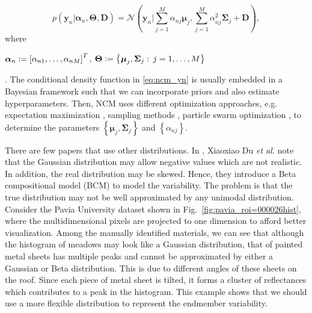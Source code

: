 \documentclass[twocolumn,english]{IEEEtran}
\theoremstyle{plain}
\begin{document}
\begin{equation}
p\left(\mathbf{y}_{n}\vert\boldsymbol{\alpha}_{n},\boldsymbol{\Theta},\mathbf{D}\right)=\mathcal{N}\left(\mathbf{y}_{n}\vert\sum_{j=1}^{M}\alpha_{nj}\boldsymbol{\mu}_{j},\sum_{j=1}^{M}\alpha_{nj}^{2}\boldsymbol{\Sigma}_{j}+\mathbf{D}\right),\label{eq:ncm_yn}
\end{equation}
where \begin{small}$\boldsymbol{\alpha}_{n}\vcentcolon=\left[\alpha_{n1},\dots,\alpha_{nM}\right]^{T}$,
$\boldsymbol{\Theta}\vcentcolon=\left\{ \boldsymbol{\mu}_{j},\boldsymbol{\Sigma}_{j}:\,j=1,\dots,M\right\} $\end{small}.
The conditional density function in \eqref{eq:ncm_yn} is usually
embedded in a Bayesian framework such that we can incorporate priors
and also estimate hyperparameters. Then, NCM uses different optimization
approaches, e.g. expectation maximization \cite{stein2003application},
sampling methods \cite{eches2010bayesian,eches2010estimating,halimi2015unsupervised},
particle swarm optimization \cite{zhangpso}, to determine the parameters
$\left\{ \boldsymbol{\mu}_{j},\boldsymbol{\Sigma}_{j}\right\} $ and
$\left\{ \alpha_{nj}\right\} $.

There are few papers that use other distributions. In \cite{du2014spatial},
Xiaoxiao Du \emph{et al.} note that the Gaussian distribution may
allow negative values which are not realistic. In addition, the real
distribution may be skewed. Hence, they introduce a Beta compositional
model (BCM) to model the variability. The problem is that the true
distribution may not be well approximated by any unimodal distribution.
Consider the Pavia University dataset shown in Fig.~\ref{fig:pavia_roi=000026hist},
where the multidimensional pixels are projected to one dimension to
afford better visualization. Among the manually identified materials,
we can see that although the histogram of meadows may look like a
Gaussian distribution, that of painted metal sheets has multiple peaks
and cannot be approximated by either a Gaussian or Beta distribution.
This is due to different angles of these sheets on the roof. Since
each piece of metal sheet is tilted, it forms a cluster of reflectances
which contributes to a peak in the histogram. This example shows that
we should use a more flexible distribution to represent the endmember
variability.
\end{document}
